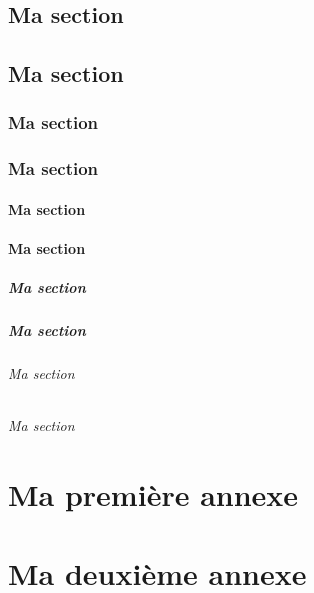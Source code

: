 \documentclass[overfullbox]{polytech}
\begin{document}
\section{Ma section}
\lipsum[1-5]

\section{Ma section}
\lipsum[1-5]

\subsection{Ma section}
\lipsum[1-5]
\subsection{Ma section}
\lipsum[1-5]
\subsubsection{Ma section}
\lipsum[1-5]
\subsubsection{Ma section}
\lipsum[1-5]
\paragraph{Ma section}
\lipsum[1-5]
\paragraph{Ma section}
\lipsum[1-5]
\subparagraph{Ma section}
\lipsum[1-5]
\subparagraph{Ma section}
\lipsum[1-5]


\appendix

\chapter{Ma première annexe}

\lipsum[1-4]

\chapter{Ma deuxième annexe}

\cite{article}

\lipsum[1-4]


\nocite{*}




\makelastpages
\end{document}
